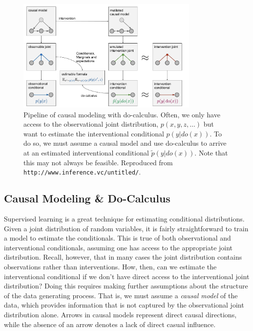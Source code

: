 \begin{figure}[t!]
    \centering
    \includegraphics[width=0.8\textwidth]{images/graphical_models/Causality_-do-calculus-estimand--1-.png}
    \caption{Pipeline of causal modeling with do-calculus. Often, we only have access to the observational joint distribution, $p(x, y, z, \dots)$ but want to estimate the interventional conditional $p(y | do(x))$. To do so, we must assume a causal model and use do-calculus to arrive at an estimated interventional conditional $\tilde{p}(y | do(x))$. Note that this may not always be feasible. Reproduced from \texttt{http://www.inference.vc/untitled/}.}
    \label{fig: causal_model}
\end{figure}

\subsection{Causal Modeling \& Do-Calculus}

Supervised learning is a great technique for estimating conditional distributions. Given a joint distribution of random variables, it is fairly straightforward to train a model to estimate the conditionals. This is true of both observational and interventional conditionals, assuming one has access to the appropriate joint distribution. Recall, however, that in many cases the joint distribution contains observations rather than interventions. How, then, can we estimate the interventional conditional if we don't have direct access to the interventional joint distribution? Doing this requires making further assumptions about the structure of the data generating process. That is, we must assume a \textit{causal model} of the data, which provides information that is not captured by the observational joint distribution alone. Arrows in causal models represent direct causal directions, while the absence of an arrow denotes a lack of direct casual influence.

